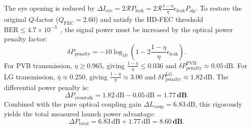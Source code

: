 \documentclass[11pt,a4paper]{article}
\begin{document}
The eye opening is reduced by $\Delta I_{\text{eye}} = 2 \mathcal{R} P_{\text{leak}} = 2 \mathcal{R} \frac{1 - \eta}{\eta} \epsilon_{\text{leak}} P_{\text{sig}}$. To restore the original $Q$-factor ($Q_{\text{FEC}} = 2.60$) and satisfy the HD-FEC threshold $\text{BER} \le 4.7 \times 10^{-3}$~\cite{ITUTG9751,Proakis2008}, the signal power must be increased by the optical power penalty factor:
\begin{equation}
\delta P_{\text{penalty}} = -10 \log_{10}\left( 1 - 2 \frac{1 - \eta}{\eta} \epsilon_{\text{leak}} \right).
\label{eq:app_eye_penalty}
\end{equation}
For PVB transmission, $\eta \ge 0.965$, giving $\frac{1 - \eta}{\eta} \le 0.036$ and $\delta P_{\text{penalty}}^{\text{PVB}} \approx 0.05\,\text{dB}$.
For LG transmission, $\bar{\eta} \approx 0.250$, giving $\frac{1 - \eta}{\eta} \approx 3.00$ and $\delta P_{\text{penalty}}^{\text{LG}} \approx 1.82\,\text{dB}$.
The differential power penalty is:
\begin{equation}
\Delta P_{\text{crosstalk}} = 1.82\,\text{dB} - 0.05\,\text{dB} = \mathbf{1.77\,\text{dB}}.
\label{eq:app_crosstalk_final}
\end{equation}
Combined with the pure optical coupling gain $\Delta L_{\text{coup}} = 6.83\,\text{dB}$, this rigorously yields the total measured launch power advantage:
\begin{equation}
\boxed{\Delta P_{\text{total}} = 6.83\,\text{dB} + 1.77\,\text{dB} = \mathbf{8.60\,\text{dB}}.}
\label{eq:app_total_860db}
\end{equation}



\end{document}
